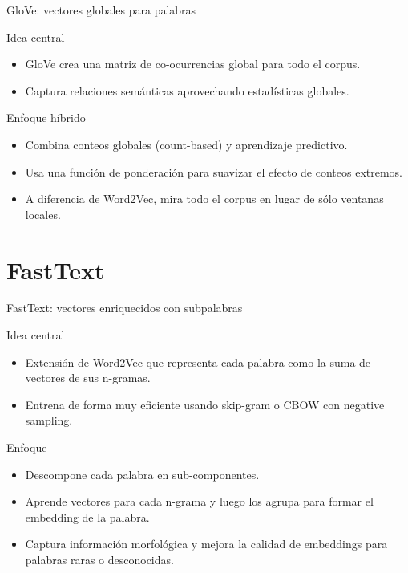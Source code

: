 \documentclass[handout]{beamer}
\begin{document}
\begin{frame}{GloVe: vectores globales para palabras}
  \begin{block}{Idea central}
    \begin{itemize}
      \item GloVe crea una matriz de co-ocurrencias global para todo el corpus.
      \item Captura relaciones semánticas aprovechando estadísticas globales.
    \end{itemize}
  \end{block}
  \begin{alertblock}{Enfoque híbrido}
    \begin{itemize}
      \item Combina conteos globales (count-based) y aprendizaje predictivo.
      \item Usa una función de ponderación para suavizar el efecto de conteos extremos.
      \item A diferencia de Word2Vec, mira todo el corpus en lugar de sólo ventanas locales.
    \end{itemize}
  \end{alertblock}
\end{frame}

\section{FastText}

\begin{frame}{FastText: vectores enriquecidos con subpalabras}
  \begin{block}{Idea central}
    \begin{itemize}
      \item Extensión de Word2Vec que representa cada palabra como la suma de vectores de sus n-gramas.
      \item Entrena de forma muy eficiente usando skip-gram o CBOW con negative sampling.
    \end{itemize}
  \end{block}
  \begin{alertblock}{Enfoque}
    \begin{itemize}
      \item Descompone cada palabra en sub-componentes.
      \item Aprende vectores para cada n-grama y luego los agrupa para formar el embedding de la palabra.
      \item Captura información morfológica y mejora la calidad de embeddings para palabras raras o desconocidas.
    \end{itemize}
  \end{alertblock}
\end{frame}
\end{document}
